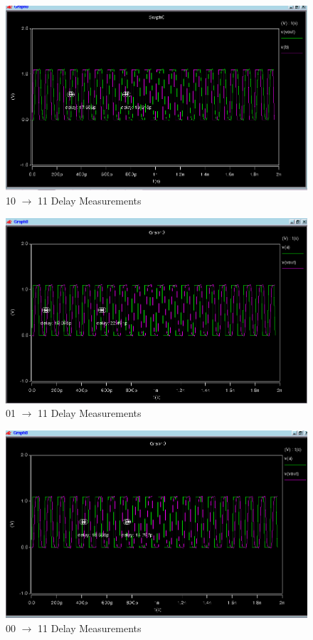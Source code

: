 \documentclass[12pt]{article}
\begin{document}
\begin{figure}[H]
\centering
\includegraphics[width=\linewidth]{10-11-delay}
\caption{10 $\to$ 11 Delay Measurements}
\label{fig:10-11-delay}
\end{figure}

\begin{figure}[H]
\centering
\includegraphics[width=\linewidth]{01-11-delay}
\caption{01 $\to$ 11 Delay Measurements}
\label{fig:01-11-delay}
\end{figure}


\begin{figure}[H]
\centering
\includegraphics[width=\linewidth]{00-11-delay}
\caption{00 $\to$ 11 Delay Measurements}
\label{fig:00-11-delay}
\end{figure}
\end{document}

